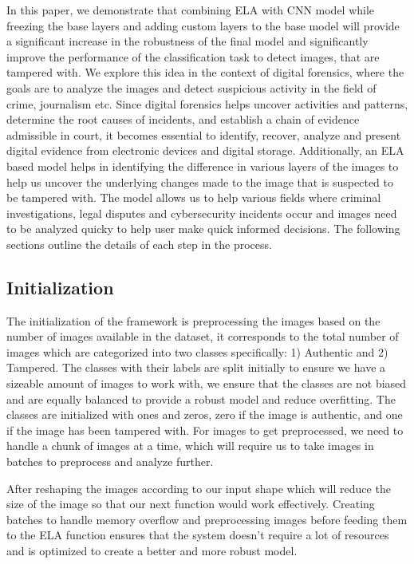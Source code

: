 \documentclass{ieeeaccess}
\begin{document}
In this paper, we demonstrate that combining ELA with CNN model while freezing the base layers and adding custom layers to the base model will provide a significant increase in the robustness of the final model and significantly improve the performance of the classification task to detect images, that are tampered with. We explore this idea in the context of digital forensics, where the goals are to analyze the images and detect suspicious activity in the field of crime, journalism etc. Since digital forensics helps uncover activities and patterns, determine the root causes of incidents, and establish a chain of evidence admissible in court, it becomes essential to identify, recover, analyze and present digital evidence from electronic devices and digital storage. Additionally, an ELA based model helps in identifying the difference in various layers of the images to help us uncover the underlying changes made to the image that is suspected to be tampered with. The model allows us to help various fields where criminal investigations, legal disputes and cybersecurity incidents occur and images need to be analyzed quicky to help user make quick informed decisions. The following sections outline the details of each step in the process.

\subsection{Initialization}

The initialization of the framework is preprocessing the images based on the number of images available in the dataset, it corresponds to the total number of images which are categorized into two classes specifically: 1) Authentic and 2) Tampered. The classes with their labels are split initially to ensure we have a sizeable amount of images to work with, we ensure that the classes are not biased and are equally balanced to provide a robust model and reduce overfitting. The classes are initialized with ones and zeros, zero if the image is authentic, and one if the image has been tampered with. For images to get preprocessed, we need to handle a chunk of images at a time, which will require us to take images in batches to preprocess and analyze further. 

After reshaping the images according to our input shape which will reduce the size of the image so that our next function would work effectively. Creating batches to handle memory overflow and preprocessing images before feeding them to the ELA function ensures that the system doesn’t require a lot of resources and is optimized to create a better and more robust model. 
\end{document}
